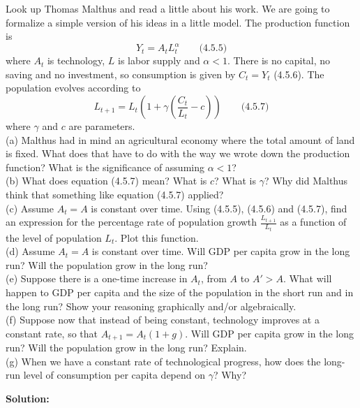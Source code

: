 \documentclass[12pt, letterpaper]{article}
\begin{document}
\begin{tcolorbox}[oddbox,title={Problem 4.5 \quad A Malthusian Model}]
\begin{tcolorbox}[questionbox]
Look up Thomas Malthus and read a little about his work. We are going to formalize a simple
version of his ideas in a little model. The production function is
$$Y_t = A_t L_t^{\alpha} \qquad\text{(4.5.5)}$$
where $A_t$ is technology, $L$ is labor supply and $\alpha < 1$. There is no capital, no
saving and no investment, so consumption is given by $C_t = Y_t$ (4.5.6). The population
evolves according to
$$L_{t+1} = L_t\left(1 + \gamma\left(\frac{C_t}{L_t} - c\right)\right) \qquad\text{(4.5.7)}$$
where $\gamma$ and $c$ are parameters.\\[3pt]
(a) Malthus had in mind an agricultural economy where the total amount of land is fixed. What
does that have to do with the way we wrote down the production function? What is the
significance of assuming $\alpha < 1$?\\
(b) What does equation (4.5.7) mean? What is $c$? What is $\gamma$? Why did Malthus think
that something like equation (4.5.7) applied?\\
(c) Assume $A_t = A$ is constant over time. Using (4.5.5), (4.5.6) and (4.5.7), find an
expression for the percentage rate of population growth $\frac{L_{t+1}}{L_t}$ as a function of
the level of population $L_t$. Plot this function.\\
(d) Assume $A_t = A$ is constant over time. Will GDP per capita grow in the long run? Will the
population grow in the long run?\\
(e) Suppose there is a one-time increase in $A_t$, from $A$ to $A' > A$. What will happen to
GDP per capita and the size of the population in the short run and in the long run? Show your
reasoning graphically and/or algebraically.\\
(f) Suppose now that instead of being constant, technology improves at a constant rate, so
that $A_{t+1} = A_t(1+g)$. Will GDP per capita grow in the long run? Will the population grow
in the long run? Explain.\\
(g) When we have a constant rate of technological progress, how does the long-run level of
consumption per capita depend on $\gamma$? Why?
\end{tcolorbox}

\textbf{Solution:}


\end{tcolorbox}
\end{document}
